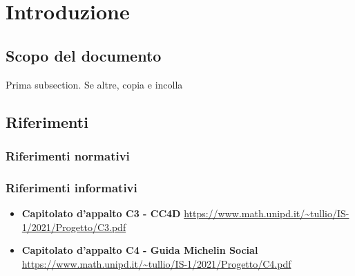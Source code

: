 	\section{Introduzione}
		\subsection {Scopo del documento} Prima subsection. Se altre, copia e incolla
		\subsection {Riferimenti} 
			\subsubsection {Riferimenti normativi} 
			\subsubsection {Riferimenti informativi} 
			\begin{itemize}
				\item \textbf{Capitolato d'appalto C3 - CC4D}\newline
				\url{https://www.math.unipd.it/~tullio/IS-1/2021/Progetto/C3.pdf}
				\item \textbf{Capitolato d'appalto C4 - Guida Michelin Social}\newline
				\url{https://www.math.unipd.it/~tullio/IS-1/2021/Progetto/C4.pdf}
			\end{itemize}